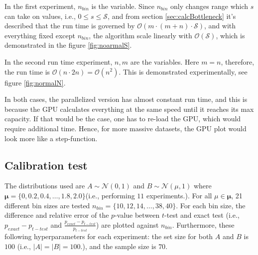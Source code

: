 \documentclass[a4paper]{article}
\begin{document}
In the first experiment, $n_{bin}$ is the variable. Since $n_{bin}$ only changes range which $s$ can take on values, i.e., $0 \leq s \leq \mathcal{S}$, and from section \ref{sec:calcBottleneck} it's described that the run time is governed by $\mathcal{O}(m\cdot (m+n)\cdot \mathcal{S})$, and with everything fixed except $n_{bin}$, the algorithm scale linearly with $\mathcal{O}(\mathcal{S})$, which is demonstrated in the figure \ref{fig:noarmalS}.

In the second run time experiment, $n,m$ are the variables. Here $m=n$, therefore, the run time is $\mathcal{O}(n \cdot 2n)=\mathcal{O}(n^{2})$. This is demonstrated experimentally, see figure \ref{fig:normalN}.

In both cases, the parallelized version has almost constant run time, and this is because the GPU calculates everything at the same speed until it reaches its max capacity. If that would be the case, one has to re-load the GPU, which would require additional time. Hence, for more massive datasets, the GPU plot would look more like a step-function. 

\subsection{Calibration test}
The distributions used are $A \sim \mathcal{N}(0,1)$ and $B \sim \mathcal{N}(\mu,1)$ where $\boldsymbol{\mu} = \{0, 0.2, 0.4, \ldots, 1.8, 2.0 \}$(i.e., performing $11$ experiments.). For all $\mu \in \boldsymbol{\mu}$, 21 different bin sizes are tested $n_{bin}=\{10,12,14,\ldots,38,40\}$. For each bin size, the difference and relative error of the $p$-value between $t$-test and exact test (i.e., $p_{exact}-p_{t-test}$  and $\frac{p_{exact}-p_{t-test}}{p_{t-test}}$) are plotted against $n_{bin}$. Furthermore, these following hyperparameters for each experiment: the set size for both $A$ and $B$ is $100$ (i.e., $|A|=|B|=100$.), and the sample size is $70$.
\end{document}
